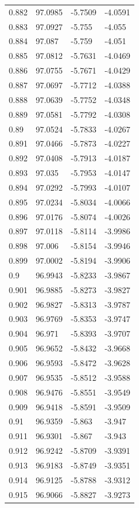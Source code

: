 \begin{tabular}{llll}
0.882 & 97.0985 & -5.7509 & -4.0591 \\
0.883 & 97.0927 & -5.755 & -4.055 \\
0.884 & 97.087 & -5.759 & -4.051 \\
0.885 & 97.0812 & -5.7631 & -4.0469 \\
0.886 & 97.0755 & -5.7671 & -4.0429 \\
0.887 & 97.0697 & -5.7712 & -4.0388 \\
0.888 & 97.0639 & -5.7752 & -4.0348 \\
0.889 & 97.0581 & -5.7792 & -4.0308 \\
0.89 & 97.0524 & -5.7833 & -4.0267 \\
0.891 & 97.0466 & -5.7873 & -4.0227 \\
0.892 & 97.0408 & -5.7913 & -4.0187 \\
0.893 & 97.035 & -5.7953 & -4.0147 \\
0.894 & 97.0292 & -5.7993 & -4.0107 \\
0.895 & 97.0234 & -5.8034 & -4.0066 \\
0.896 & 97.0176 & -5.8074 & -4.0026 \\
0.897 & 97.0118 & -5.8114 & -3.9986 \\
0.898 & 97.006 & -5.8154 & -3.9946 \\
0.899 & 97.0002 & -5.8194 & -3.9906 \\
0.9 & 96.9943 & -5.8233 & -3.9867 \\
0.901 & 96.9885 & -5.8273 & -3.9827 \\
0.902 & 96.9827 & -5.8313 & -3.9787 \\
0.903 & 96.9769 & -5.8353 & -3.9747 \\
0.904 & 96.971 & -5.8393 & -3.9707 \\
0.905 & 96.9652 & -5.8432 & -3.9668 \\
0.906 & 96.9593 & -5.8472 & -3.9628 \\
0.907 & 96.9535 & -5.8512 & -3.9588 \\
0.908 & 96.9476 & -5.8551 & -3.9549 \\
0.909 & 96.9418 & -5.8591 & -3.9509 \\
0.91 & 96.9359 & -5.863 & -3.947 \\
0.911 & 96.9301 & -5.867 & -3.943 \\
0.912 & 96.9242 & -5.8709 & -3.9391 \\
0.913 & 96.9183 & -5.8749 & -3.9351 \\
0.914 & 96.9125 & -5.8788 & -3.9312 \\
0.915 & 96.9066 & -5.8827 & -3.9273 \\

\end{tabular}

